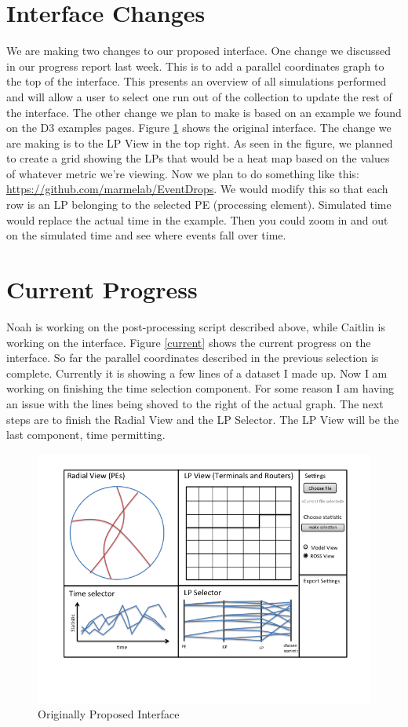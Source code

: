 \documentclass[12pt]{article}
\begin{document}
\section{Interface Changes}
We are making two changes to our proposed interface. One change we discussed in our progress report last week.  This is to add a parallel coordinates graph to the top of the interface.  This presents an overview of all simulations performed and will allow a user to select one run out of the collection to update the rest of the interface.   The other change we plan to make is based on an example we found on the D3 examples pages.  Figure \ref{ross-view} shows the original interface.  The change we are making is to the LP View in the top right.  As seen in the figure, we planned to create a grid showing the LPs that would be a heat map based on the values of whatever metric we're viewing.  Now we plan to do something like this: \url{https://github.com/marmelab/EventDrops}.  We would modify this so that each row is an LP belonging to the selected PE (processing element).  Simulated time would replace the actual time in the example.  Then you could zoom in and out on the simulated time and see where events fall over time.

\section{Current Progress}
Noah is working on the post-processing script described above, while Caitlin is working on the interface.  Figure \ref{current} shows the current progress on the interface.  So far the parallel coordinates described in the previous selection is complete.  Currently it is showing a few lines of a dataset I made up.  Now I am working on finishing the time selection component.  For some reason I am having an issue with the lines being shoved to the right of the actual graph.  The next steps are to finish the Radial View and the LP Selector.  The LP View will be the last component, time permitting.  

\begin{figure}[t]
\centering
   \includegraphics[width=6.5in, clip=true, trim=0 1in 0 0]{../../figures/gui-diagram/Slide2.png}
\caption{Originally Proposed Interface}
\label{ross-view}
\end{figure}
\end{document}
